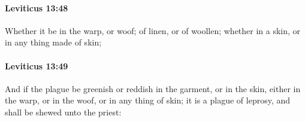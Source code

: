 		\paragraph{Leviticus 13:48} %
			\label{LEVITICUS-13-48}

			Whether it be in the warp, or woof; of linen, or of woollen; whether in a skin, or in any thing made of skin;


		\paragraph{Leviticus 13:49} %
			\label{LEVITICUS-13-49}

			And if the plague be greenish or reddish in the garment, or in the skin, either in the warp, or in the woof, or in any thing of skin; it is a plague of leprosy, and shall be shewed unto the priest:


